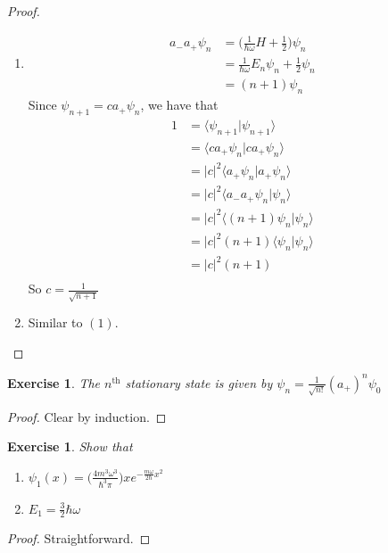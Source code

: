 \documentclass[12pt]{amsart}
\newtheorem{ex}[thm]{Exercise}
\renewcommand{\r}{\rangle}
\renewcommand{\l}{\langle}
\newcommand{\om}{\omega}
\begin{document}
\begin{proof}\
\begin{enumerate}
\item 
\begin{align*}
a_-a_+\psi_n
&= \bigg(\frac{1}{\hbar \om}H +\frac{1}{2}\bigg)\psi_n\\
&= \frac{1}{\hbar \om}E_n \psi_n + \frac{1}{2} \psi_n\\
&= (n+1) \psi_n
\end{align*}
Since $\psi_{n+1} = ca_+\psi_{n}$, we have that
\begin{align*}
1
&=\l \psi_{n+1}\vert \psi_{n+1}\r\\
&=\l c a_+\psi_n \vert ca_+\psi_n\r\\
&= \vert c\vert^2 \l a_+ \psi_n\vert a_+ \psi_n \r\\
&= \vert c\vert^2 \l a_- a_+\psi_n \vert \psi_n \r\\
&= \vert c\vert^2 \l (n+1)\psi_n \vert \psi_n \r\\
&= \vert c\vert^2  (n+1) \l \psi_n \vert \psi_n \r\\
&= \vert c\vert^2  (n+1)\\
\end{align*}
So $c = \frac{1}{\sqrt{n+1}}$\vspace{2mm}

\item Similar to $(1)$.
\end{enumerate}
\end{proof}

\begin{ex}
The $n^{\text{th}}$ stationary state is given by $\psi_n = \frac{1}{\sqrt{n!}}(a_+)^n\psi_0$
\end{ex}

\begin{proof}
Clear by induction.
\end{proof}

\begin{ex}
Show that
\begin{enumerate}
\item $\psi_1(x) = \big(\frac{4m^3 \om^3}{\hbar^3 \pi} \big)xe^{-\frac{m \om}{2 \hbar}x^2}$
\item $E_1 = \frac{3}{2} \hbar \om$
\end{enumerate}
\end{ex}

\begin{proof}
Straightforward.
\end{proof}
\end{document}
